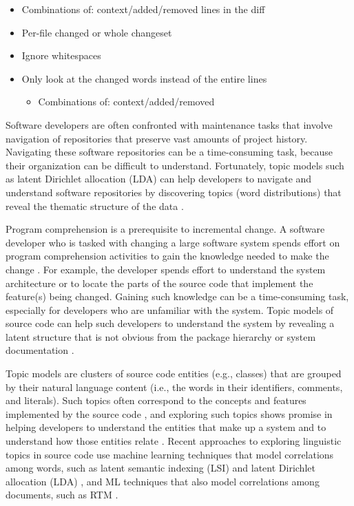 \documentclass[12pt,draft]{Manuscript}
\begin{document}
\begin{body}
\begin{itemize}
  \begin{itemize}
  \itemsep1pt\parskip0pt
  \item
    Combinations of: context/added/removed lines in the diff
  \item
    Per-file changed or whole changeset
  \item
    Ignore whitespaces
  \item
    Only look at the changed words instead of the entire lines

    \begin{itemize}
    \itemsep1pt\parskip0pt
    \item
      Combinations of: context/added/removed
    \end{itemize}
  \end{itemize}
\end{itemize}

Software developers are often confronted with maintenance tasks that
involve navigation of repositories that preserve vast amounts of project
history. Navigating these software repositories can be a time-consuming
task, because their organization can be difficult to understand.
Fortunately, topic models such as latent Dirichlet allocation (LDA)
\citep{Blei-etal:2003} can help developers to navigate and understand
software repositories by discovering topics (word distributions) that
reveal the thematic structure of the data
\citep{Linstead-etal:2007, Thomas-etal:2011, Hindle-etal:2012}.

Program comprehension is a prerequisite to incremental change. A
software developer who is tasked with changing a large software system
spends effort on program comprehension activities to gain the knowledge
needed to make the change \citep{Corbi:1989}. For example, the developer
spends effort to understand the system architecture or to locate the
parts of the source code that implement the feature(s) being changed.
Gaining such knowledge can be a time-consuming task, especially for
developers who are unfamiliar with the system. Topic models of source
code can help such developers to understand the system by revealing a
latent structure that is not obvious from the package hierarchy or
system documentation \citep{Savage-etal:2010}.

Topic models are clusters of source code entities (e.g., classes) that
are grouped by their natural language content (i.e., the words in their
identifiers, comments, and literals). Such topics often correspond to
the concepts and features implemented by the source code
\citep{Baldi-etal:2008}, and exploring such topics shows promise in
helping developers to understand the entities that make up a system and
to understand how those entities relate
\citep{Kuhn-etal:2007, Maskeri-etal:2008, Savage-etal:2010, Gethers-etal:2011a}.
Recent approaches to exploring linguistic topics in source code use
machine learning techniques that model correlations among words, such as
latent semantic indexing (LSI) \citep{Deerwester-etal:1990} and latent
Dirichlet allocation (LDA) \citep{Blei-etal:2003}, and ML techniques
that also model correlations among documents, such as RTM
\citep{Chang-Blei:2010}.


\end{body}
\end{document}
